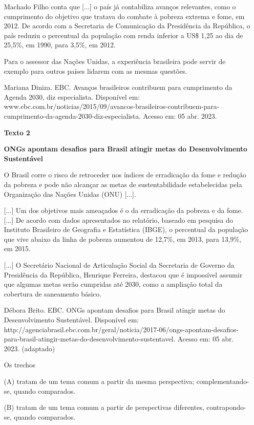 \begin{itemize}
\begin{itemize}
{\begin{itemize}
\begin{itemize}
Machado Filho conta que {[}...{]} o país já contabiliza avanços
relevantes, como o cumprimento do objetivo que tratava do combate à
pobreza extrema e fome, em 2012. De acordo com a Secretaria de
Comunicação da Presidência da República, o país reduziu o percentual da
população com renda inferior a US\$ 1,25 ao dia de 25,5\%, em 1990, para
3,5\%, em 2012.

Para o assessor das Nações Unidas, a experiência brasileira pode servir
de exemplo para outros países lidarem com as mesmas questões.

Mariana Diniza. EBC. Avanços brasileiros contribuem para cumprimento da
Agenda 2030, diz especialista. Disponível em:
www.ebc.com.br/noticias/2015/09/avancos-brasileiros-contribuem-para-cumprimento-da-agenda-2030-diz-especialista.
Acesso em: 05 abr. 2023.

\textbf{Texto 2}

\textbf{ONGs apontam desafios para Brasil atingir metas do
Desenvolvimento Sustentável}

O Brasil corre o risco de retroceder nos índices de erradicação da fome
e redução da pobreza e pode não alcançar as metas de sustentabilidade
estabelecidas pela Organização das Nações Unidas (ONU) {[}...{]}.

{[}...{]} Um dos objetivos mais ameaçados é o da erradicação da pobreza
e da fome. {[}...{]} De acordo com dados apresentados no relatório,
baseado em pesquisa do Instituto Brasileiro de Geografia e Estatística
(IBGE), o percentual da população que vive abaixo da linha de pobreza
aumentou de 12,7\%, em 2013, para 13,9\%, em 2015.

{[}...{]} O Secretário Nacional de Articulação Social da Secretaria de
Governo da Presidência da República, Henrique Ferreira, destacou que é
impossível assumir que algumas metas serão cumpridas até 2030, como a
ampliação total da cobertura de saneamento básico.

Débora Brito. EBC. ONGs apontam desafios para Brasil atingir metas do
Desenvolvimento Sustentável. Disponível em:
http://agenciabrasil.ebc.com.br/geral/noticia/2017-06/ongs-apontam-desafios-para-brasil-atingir-metas-do-desenvolvimento-sustentavel.
Acesso em: 05 abr. 2023. (adaptado)

Os trechos

(A) tratam de um tema comum a partir da mesma perspectiva;
complementando-se, quando comparados.

(B) tratam de um tema comum a partir de perspectivas diferentes,
contrapondo-se, quando comparados.


\end{itemize}
\end{itemize}}
\end{itemize}
\end{itemize}
